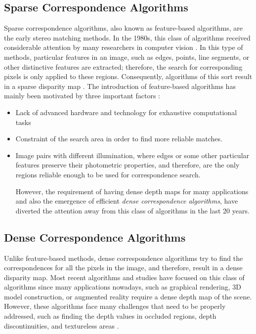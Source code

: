 \documentclass[12pt]{report}
\begin{document}
\subsection{Sparse Correspondence Algorithms}
Sparse correspondence algorithms, also known as feature-based algorithms, are the early stereo matching methods. In the 1980s, this class of algorithms received considerable attention by
many researchers in computer vision \cite{dhon89}.
In this type of methods, particular features in an image, such as edges, 
points, line segments, or other distinctive features are extracted; therefore, the search for corresponding pixels is only applied to these regions. 
Consequently, algorithms of this
sort result in a sparse disparity map \cite{matt89,hsie92, sze11}. The introduction of feature-based algorithms has mainly been motivated by three important factors \cite{bro03,sze11}:
\begin{itemize}
\item Lack of advanced hardware and technology for exhaustive computational tasks 
\item Constraint of the search area in order to find more reliable matches.
\item Image pairs with different illumination, where edges or some other particular features preserve their photometric properties, and therefore, are the only regions reliable enough to 
be used for correspondence search.

However, the requirement of having dense depth maps for many applications and also the emergence of efficient {\it dense correspondence algorithms}, have diverted the attention away
from this class of algorithms in the last 20 years.
\end{itemize}

\subsection{Dense Correspondence Algorithms}
Unlike feature-based methods, dense correspondence algorithms try to find the
correspondences for all the pixels in the image, and therefore, result in a dense disparity map. Most recent algorithms and studies have focused on this class of algorithms since many applications 
nowadays, such as graphical rendering, 3D model construction, or augmented reality require a dense depth map of the scene. 
However, these algorithms face many challenges that need to be properly
addressed, such as finding the depth values in occluded regions, depth discontinuities, and textureless areas \cite{sch02,bro03}.
\end{document}
